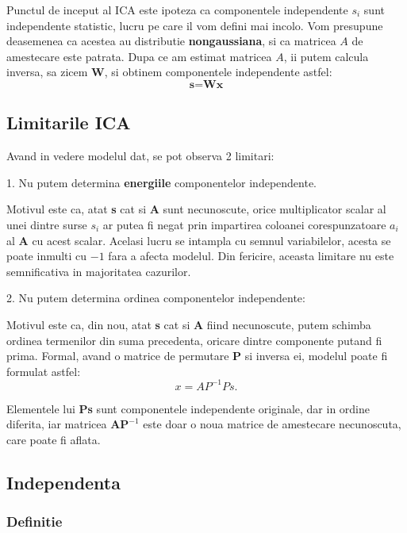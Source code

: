 \documentclass[12pt,oneside]{article}
\begin{document}
Punctul de inceput al ICA este ipoteza ca componentele independente $s_i$ sunt independente statistic, lucru pe care il vom defini mai incolo. Vom presupune deasemenea ca acestea au distributie \textbf{nongaussiana}, si ca matricea $A$ de amestecare este patrata. Dupa ce am estimat matricea $A$, ii putem calcula inversa, sa zicem \textbf{W}, si obtinem componentele independente astfel:
\begin{equation}
\textbf{s}=\textbf{Wx}
\end{equation}

\subsection{Limitarile ICA}
Avand in vedere modelul dat, se pot observa 2 limitari:

1. Nu putem determina \textbf{energiile} componentelor independente.

Motivul este ca, atat \textbf{s} cat si \textbf{A} sunt necunoscute, orice multiplicator scalar al unei dintre surse $s_i$ ar putea fi negat prin impartirea coloanei corespunzatoare $a_i$ al \textbf{A} cu acest scalar. Acelasi lucru se intampla cu semnul variabilelor, acesta se poate inmulti cu $-1$ fara a afecta modelul. Din fericire, aceasta limitare nu este semnificativa in majoritatea cazurilor.

2. Nu putem determina ordinea componentelor independente:

Motivul este ca, din nou, atat \textbf{s} cat si \textbf{A} fiind necunoscute, putem schimba ordinea termenilor din suma precedenta, oricare dintre componente putand fi prima. Formal, avand o matrice de permutare \textbf{P} si inversa ei, modelul poate fi formulat astfel:
\begin{equation}
	x=AP^{-1}Ps.
\end{equation}

Elementele lui \textbf{Ps} sunt componentele independente originale, dar in ordine diferita, iar matricea $\textbf{AP}^{-1}$ este doar o noua matrice de amestecare necunoscuta, care poate fi aflata.
\newpage

\subsection{Independenta}
\subsubsection{Definitie} 
\end{document}
